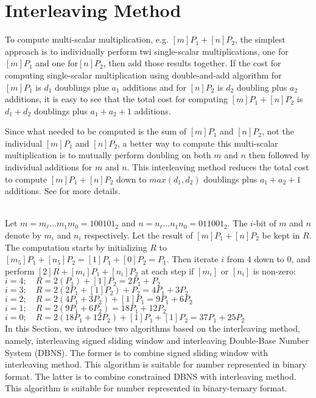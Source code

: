 \section{Interleaving Method}
To compute multi-scalar multiplication, e.g. $[m]P_1+[n]P_2$,
the simplest approach is to individually perform twi single-scalar multiplications,
one for $[m]P_1$ and one for$[n]P_2$, then add those results together.
If the cost for computing single-scalar multiplication using double-and-add algorithm
for $[m]P_1$ is $d_1$ doublings plue $a_1$ additions and for $[n]P_2$ is $d_2$ doubling plus $a_2$ additions,
it is easy to see that the total cost for computing $[m]P_1 + [n]P_2$ is $d_1 + d_2$ doublings plus $a_1 + a_2 + 1$ additions.

Since what needed to be computed is the sum of $[m]P_1$ and $[n]P_2$, not the individual $[m]P_1$ and $[n]P_2$,
a better way to compute this multi-scalar multiplication is to mutually perform doubling on both $m$ and $n$
then followed by individual additions for $m$ and $n$.
This interleaving method reduces the total cost to compute $[m]P_1 + [n]P_2$ down to
$max(d_1,d_2)$ doublings plus $a_1 + a_2 + 1$ additions.
See \cite{DI08} for more details.

 \\
Let $m = m_\ell \dots m_1 m_0 = {100101}_2$ and $n = n_\ell \dots n_1 n_0 = {011001}_2$.
The $i$-bit of $m$ and $n$ denote by $m_i$ and $n_i$ respectively.
Let the result of $[m]P_1 + [n]P_2$ be kept in $R$.
The computation starts by initializing $R$ to $[m_5]P_1 + [n_5]P_2 = [1]P_1 + [0]P_2 = P_1$.
Then iterate $i$ from $4$ down to $0$, and perform $[2]R + [m_i]P_1 + [n_i]P_2$ at each step if $[m_i]$ or $[n_i]$ is non-zero: \\
$i=4; \quad R = 2(P_1) + [1]P_2 = 2P_1 + P_2$ \\
$i=3; \quad R = 2(2P_1 + [1]P_2) + P_2 = 4P_1 + 3P_2$ \\
$i=2; \quad R = 2(4P_1 + 3P_2) + [1]P_1 = 9P_1 + 6P_2$ \\
$i=1; \quad R = 2(9P_1 + 6P_2) = 18P_1 + 12P_2$ \\
$i=0; \quad R = 2(18P_1 + 12P_2) + [1]P_1 + [1]P_2 = 37P_1 + 25P_2$ \\

In this Section, we introduce two algorithms based on the interleaving method,
namely, interleaving signed sliding window and interleaving Double-Base Number System (DBNS).
The former is to combine signed sliding window with interleaving method.
This algorithm is suitable for number represented in binary format.
The latter is to combine constrained DBNS with interleaving method.
This algorithm is suitable for number represented in binary-ternary format.



